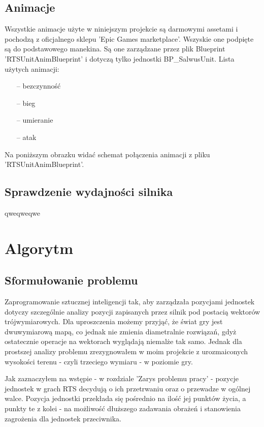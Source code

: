 \documentclass[12pt]{report}
\begin{document}
\section{Animacje}
Wszystkie animacje użyte w niniejszym projekcie są darmowymi assetami i pochodzą z oficjalnego sklepu 'Epic Games marketplace'. Wszyskie one podpięte są do podstawowego manekina. Są one zarządzane przez plik Blueprint 'RTSUnitAnimBlueprint' i dotyczą tylko jednostki BP_SalwusUnit. Lista użytych animacji:
\begin{itemize}
\item[--] bezczynność 
\item[--] bieg
\item[--] umieranie 
\item[--] atak 
\end{itemize}

Na poniższym obrazku widać schemat połączenia animacji z pliku 'RTSUnitAnimBlueprint'.



\section{Sprawdzenie wydajności silnika}
qweqweqwe
\chapter{Algorytm}
\section{Sformułowanie problemu}
Zaprogramowanie sztucznej inteligencji tak, aby zarządzała pozycjami jednostek dotyczy szczególnie analizy pozycji zapisanych przez silnik pod postacią wektorów trójwymiarowych. Dla uproszczenia możemy przyjąć, że świat gry jest dwuwymiarową mapą, co jednak nie zmienia diametralnie rozwiązań, gdyż ostatecznie operacje na wektorach wyglądają niemalże tak samo. Jednak dla prostszej analizy problemu zrezygnowałem w moim projekcie z urozmaiconych wysokości terenu - czyli trzeciego wymiaru - w poziomie gry.

Jak zaznaczyłem na wstępie - w rozdziale 'Zarys problemu pracy' - pozycje jednostek w grach RTS decydują o ich przetrwaniu oraz o przewadze w ogólnej walce. Pozycja jednostki przekłada się pośrednio na ilość jej punktów życia, a punkty te z kolei - na możliwość dłuższego zadawania obrażeń i stanowienia zagrożenia dla jednostek przeciwnika.
\end{document}
